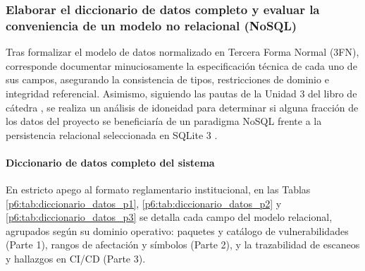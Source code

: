 \subsubsection{Elaborar el diccionario de datos completo y evaluar la conveniencia de un modelo no relacional (NoSQL)}

Tras formalizar el modelo de datos normalizado en Tercera Forma Normal (3FN), corresponde documentar minuciosamente la especificación técnica de cada uno de sus campos, asegurando la consistencia de tipos, restricciones de dominio e integridad referencial. Asimismo, siguiendo las pautas de la Unidad 3 del libro de cátedra \cite{torres2026proyecto}, se realiza un análisis de idoneidad para determinar si alguna fracción de los datos del proyecto se beneficiaría de un paradigma NoSQL frente a la persistencia relacional seleccionada en SQLite 3 \cite{torres2026proyecto}.

\paragraph*{Diccionario de datos completo del sistema}
En estricto apego al formato reglamentario institucional, en las Tablas \ref{p6:tab:diccionario_datos_p1}, \ref{p6:tab:diccionario_datos_p2} y \ref{p6:tab:diccionario_datos_p3} se detalla cada campo del modelo relacional, agrupados según su dominio operativo: paquetes y catálogo de vulnerabilidades (Parte 1), rangos de afectación y símbolos (Parte 2), y la trazabilidad de escaneos y hallazgos en CI/CD (Parte 3).

\newpage


